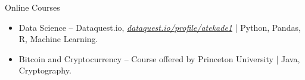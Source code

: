 \documentclass[]{mcdowellcv}
\begin{document}
	\vspace*{-3mm}
	\begin{cvsection}{Online Courses}
		\begin{cvsubsection}{}{}{}	
			\begin{itemize}
				\item Data Science -- Dataquest.io, \textit{\href{https://www.dataquest.io/profile/atekade1}{dataquest.io/profile/atekade1}} | Python, Pandas, R, Machine Learning.
				\item Bitcoin and Cryptocurrency -- Course offered by Princeton University | Java, Cryptography.
			\end{itemize}
		\end{cvsubsection}
	\end{cvsection}
\end{document}
